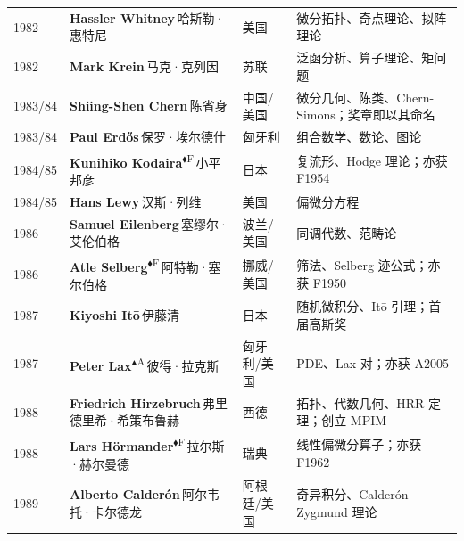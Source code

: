 \documentclass[a4paper,10pt]{article}
\newcommand{\Fbadge}{\textsuperscript{\normalfont\scriptsize\sffamily\color{fieldsclr}$\blacklozenge$F}}
\newcommand{\Abadge}{\textsuperscript{\normalfont\scriptsize\sffamily\color{abelclr}$\blacktriangle$A}}
\begin{document}
\begin{longtable}{
  >{\raggedright}m{1.8cm}
  >{\raggedright}m{7.0cm}
  >{\raggedright}m{4.2cm}
  >{\raggedright\arraybackslash}m{9.5cm}
}
{\color{yearcolor}1982} & {\bfseries Hassler Whitney}\,{\small\color{mutedgray}哈斯勒·惠特尼} & 美国 & {\small\color{fieldcolor}微分拓扑、奇点理论、拟阵理论} \\[2pt]
{\color{yearcolor}1982} & {\bfseries Mark Krein}\,{\small\color{mutedgray}马克·克列因} & 苏联 & {\small\color{fieldcolor}泛函分析、算子理论、矩问题} \\[2pt]
{\color{yearcolor}1983/84} & {\bfseries Shiing-Shen Chern}\,{\small\color{mutedgray}陈省身} & 中国/美国 & {\small\color{fieldcolor}微分几何、陈类、Chern-Simons；奖章即以其命名} \\[2pt]
{\color{yearcolor}1983/84} & {\bfseries Paul Erdős}\,{\small\color{mutedgray}保罗·埃尔德什} & 匈牙利 & {\small\color{fieldcolor}组合数学、数论、图论} \\[2pt]
{\color{yearcolor}1984/85} & {\bfseries Kunihiko Kodaira}\Fbadge\,{\small\color{mutedgray}小平邦彦} & 日本 & {\small\color{fieldcolor}复流形、Hodge 理论；亦获 F1954} \\[2pt]
{\color{yearcolor}1984/85} & {\bfseries Hans Lewy}\,{\small\color{mutedgray}汉斯·列维} & 美国 & {\small\color{fieldcolor}偏微分方程} \\[2pt]
{\color{yearcolor}1986} & {\bfseries Samuel Eilenberg}\,{\small\color{mutedgray}塞缪尔·艾伦伯格} & 波兰/美国 & {\small\color{fieldcolor}同调代数、范畴论} \\[2pt]
{\color{yearcolor}1986} & {\bfseries Atle Selberg}\Fbadge\,{\small\color{mutedgray}阿特勒·塞尔伯格} & 挪威/美国 & {\small\color{fieldcolor}筛法、Selberg 迹公式；亦获 F1950} \\[2pt]
{\color{yearcolor}1987} & {\bfseries Kiyoshi Itō}\,{\small\color{mutedgray}伊藤清} & 日本 & {\small\color{fieldcolor}随机微积分、Itō 引理；首届高斯奖} \\[2pt]
{\color{yearcolor}1987} & {\bfseries Peter Lax}\Abadge\,{\small\color{mutedgray}彼得·拉克斯} & 匈牙利/美国 & {\small\color{fieldcolor}PDE、Lax 对；亦获 A2005} \\[2pt]
{\color{yearcolor}1988} & {\bfseries Friedrich Hirzebruch}\,{\small\color{mutedgray}弗里德里希·希策布鲁赫} & 西德 & {\small\color{fieldcolor}拓扑、代数几何、HRR 定理；创立 MPIM} \\[2pt]
{\color{yearcolor}1988} & {\bfseries Lars Hörmander}\Fbadge\,{\small\color{mutedgray}拉尔斯·赫尔曼德} & 瑞典 & {\small\color{fieldcolor}线性偏微分算子；亦获 F1962} \\[2pt]
{\color{yearcolor}1989} & {\bfseries Alberto Calderón}\,{\small\color{mutedgray}阿尔韦托·卡尔德龙} & 阿根廷/美国 & {\small\color{fieldcolor}奇异积分、Calderón-Zygmund 理论} \\[2pt]

\end{longtable}
\end{document}
